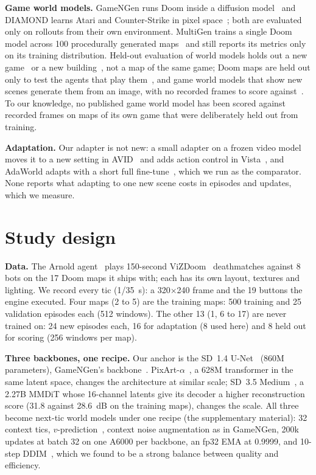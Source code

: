 \documentclass{article}
\newif\ifwithappendix \withappendixfalse %
\newcommand{\appref}[1]{\ifwithappendix Appendix~\ref{#1}\else the supplementary material\fi}
\begin{document}
\textbf{Game world models.} GameNGen runs Doom inside a diffusion model~\citep{valevski2024gamengen} and DIAMOND learns Atari and Counter-Strike in pixel space~\citep{alonso2024diamond}; both are evaluated only on rollouts from their own environment. MultiGen trains a single Doom model across 100 procedurally generated maps~\citep{po2026multigen} and still reports its metrics only on its training distribution. Held-out evaluation of world models holds out a new game~\citep{rigter2024avid,gao2025adaworld} or a new building~\citep{koh2021pathdreamer}, not a map of the same game; Doom maps are held out only to test the agents that play them~\citep{lample2017arnold,wydmuch2018vizdoom}, and game world models that show new scenes generate them from an image, with no recorded frames to score against~\citep{bruce2024genie}. To our knowledge, no published game world model has been scored against recorded frames on maps of its own game that were deliberately held out from training.

\textbf{Adaptation.} Our adapter is not new: a small adapter on a frozen video model moves it to a new setting in AVID~\citep{rigter2024avid} and adds action control in Vista~\citep{gao2024vista}, and AdaWorld adapts with a short full fine-tune~\citep{gao2025adaworld}, which we run as the comparator. None reports what adapting to one new scene costs in episodes and updates, which we measure.


\section{Study design}
\label{sec:bench}

\textbf{Data.} The Arnold agent~\citep{lample2017arnold} plays 150-second ViZDoom~\citep{kempka2016vizdoom} deathmatches against 8 bots on the 17 Doom maps it ships with; each has its own layout, textures and lighting. We record every tic (1/35~s): a 320$\times$240 frame and the 19 buttons the engine executed. Four maps (2 to 5) are the training maps: 500 training and 25 validation episodes each (512 windows). The other 13 (1, 6 to 17) are never trained on: 24 new episodes each, 16 for adaptation (8 used here) and 8 held out for scoring (256 windows per map).

\textbf{Three backbones, one recipe.} Our anchor is the SD~1.4 U-Net~\citep{rombach2022ldm} (860M parameters), GameNGen's backbone~\citep{valevski2024gamengen}. PixArt-$\alpha$~\citep{chen2023pixart}, a 628M transformer in the same latent space, changes the architecture at similar scale; SD~3.5 Medium~\citep{esser2024sd3}, a 2.27B MMDiT whose 16-channel latents give its decoder a higher reconstruction score (31.8 against 28.6~dB on the training maps), changes the scale. All three become next-tic world models under one recipe (\appref{app:overview}): 32 context tics, $v$-prediction~\citep{salimans2022progressive}, context noise augmentation as in GameNGen, 200k updates at batch 32 on one A6000 per backbone, an fp32 EMA at 0.9999, and 10-step DDIM~\citep{song2021ddim}, which we found to be a strong balance between quality and efficiency.
\end{document}
